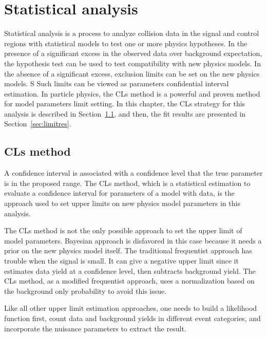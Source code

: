 \chapter{Statistical analysis}
\label{ch:stat-ana}

\par Statistical analysis is a process to analyze collision data in the signal and control regions with statistical models to test one or more physics hypotheses. 
In the presence of a significant excess in the observed data over background expectation, the hypothesis test can be used to test compatibility with new physics models. 
In the absence of a significant excess, exclusion limits can be set on the new physics models. S
Such limits can be viewed as parameters confidential interval estimation. 
In particle physics, the CLs method\cite{Read:2002hq} is a powerful and proven method for model parameters limit setting. 
In this chapter, the CLs strategy for this analysis is described in Section~\ref{sec:cls}, and then, the fit results are presented in Section~\ref{sec:limitres}. 

\section{CLs method}
\label{sec:cls}

\par A confidence interval is associated with a confidence level that the true parameter is in the proposed range. 
The CLs method, which is a statistical estimation to evaluate a confidence interval for parameters of a model with data, is the approach used to set upper limits on new physics model parameters in this analysis.

\par The CLs method is not the only possible approach to set the upper limit of model parameters. 
Bayesian approach is disfavored in this case because it needs a prior on the new physics model itself.
The traditional frequentist approach has trouble when the signal is small. 
It can give a negative upper limit since it estimates data yield at a confidence level, then subtracts background yield.
The CLs method, as a modified frequentist approach, uses a normalization based on the background only probability to avoid this issue.

\par Like all other upper limit estimation approaches, one needs to build a likelihood function first, count data and background yields in different event categories, and incorporate the nuisance parameters to extract the result. 

